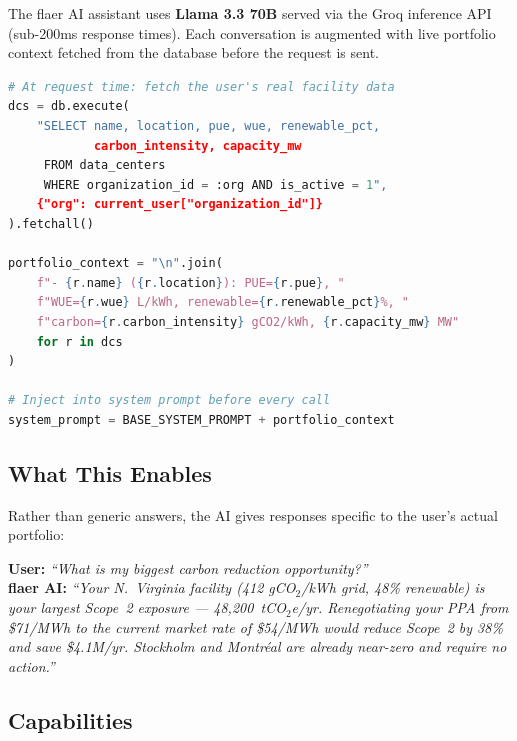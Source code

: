\documentclass[11pt, a4paper]{article}
\begin{document}
The flaer AI assistant uses \textbf{Llama 3.3 70B} served via the Groq inference API (sub-200ms response times). Each conversation is augmented with live portfolio context fetched from the database before the request is sent.

\begin{lstlisting}[language=Python, caption=System prompt injection with live portfolio data]
# At request time: fetch the user's real facility data
dcs = db.execute(
    "SELECT name, location, pue, wue, renewable_pct,
            carbon_intensity, capacity_mw
     FROM data_centers
     WHERE organization_id = :org AND is_active = 1",
    {"org": current_user["organization_id"]}
).fetchall()

portfolio_context = "\n".join(
    f"- {r.name} ({r.location}): PUE={r.pue}, "
    f"WUE={r.wue} L/kWh, renewable={r.renewable_pct}%, "
    f"carbon={r.carbon_intensity} gCO2/kWh, {r.capacity_mw} MW"
    for r in dcs
)

# Inject into system prompt before every call
system_prompt = BASE_SYSTEM_PROMPT + portfolio_context
\end{lstlisting}

\subsection{What This Enables}

Rather than generic answers, the AI gives responses specific to the user's actual portfolio:

\begin{tcolorbox}[bluebox]
\textbf{User:} \textit{``What is my biggest carbon reduction opportunity?''}\\[4pt]
\textbf{flaer AI:} \textit{``Your N.~Virginia facility (412 gCO$_2$/kWh grid, 48\% renewable) is your largest Scope~2 exposure — 48,200~tCO$_2$e/yr. Renegotiating your PPA from \$71/MWh to the current market rate of \$54/MWh would reduce Scope~2 by 38\% and save \$4.1M/yr. Stockholm and Montréal are already near-zero and require no action.''}
\end{tcolorbox}

\subsection{Capabilities}
\end{document}
